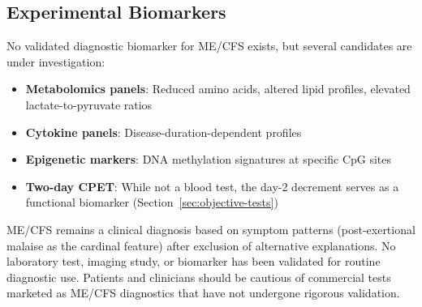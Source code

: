 \subsection{Experimental Biomarkers}

No validated diagnostic biomarker for ME/CFS exists, but several candidates are under investigation:

\begin{itemize}
    \item \textbf{Metabolomics panels}: Reduced amino acids, altered lipid profiles, elevated lactate-to-pyruvate ratios~\cite{Naviaux2016metabolomics,Germain2020metabolic}
    \item \textbf{Cytokine panels}: Disease-duration-dependent profiles~\cite{Hornig2015,Montoya2017}
    \item \textbf{Epigenetic markers}: DNA methylation signatures at specific CpG sites~\cite{deVega2021dna_methylation}
    \item \textbf{Two-day CPET}: While not a blood test, the day-2 decrement serves as a functional biomarker (Section~\ref{sec:objective-tests})
\end{itemize}

\begin{warning}
ME/CFS remains a clinical diagnosis based on symptom patterns (post-exertional malaise as the cardinal feature) after exclusion of alternative explanations. No laboratory test, imaging study, or biomarker has been validated for routine diagnostic use. Patients and clinicians should be cautious of commercial tests marketed as ME/CFS diagnostics that have not undergone rigorous validation.
\end{warning}
